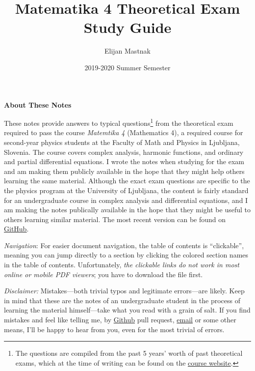 \documentclass[11pt, a4paper]{article}
\begin{document}
\title{Matematika 4 Theoretical Exam Study Guide}
\author{Elijan Mastnak}
\date{2019-2020 Summer Semester}
\maketitle

\begin{center}
\textbf{About These Notes}
\end{center}
These notes provide answers to typical questions\footnote{The questions are compiled from the past 5 years' worth of past theoretical exams, which at the time of writing can be found on the \href{https://www.fmf.uni-lj.si/~magajna/Matematika4FIZ/osnovna.htm}{\underline{course website}}.} from the theoretical exam required to pass the course \textit{Matemtika 4} (Mathematics 4), a required course for second-year physics students at the Faculty of Math and Physics in Ljubljana, Slovenia. The course covers complex analysis, harmonic functions, and ordinary and partial differential equations. I wrote the notes when studying for the exam and am making them publicly available in the hope that they might help others learning the same material. Although the exact exam questions are specific to the the physics program at the University of Ljubljana, the content is fairly standard for an undergraduate course in complex analysis and differential equations, and I am making the notes publically available in the hope that they might be useful to others learning similar material. The most recent version can be found on \href{https://github.com/ejmastnak/fmf/tree/main/math-4}{\underline{GitHub}}.


\vspace{2mm}
\textit{Navigation}: For easier document navigation, the table of contents is ``clickable'', meaning you can jump directly to a section by clicking the colored section names in the table of contents. Unfortunately, \textit{the clickable links do not work in most online or mobile PDF viewers}; you have to download the file first.


\vspace{2mm}
\textit{Disclaimer:} Mistakes---both trivial typos and legitimate errors---are likely. Keep in mind that these are the notes of an undergraduate student in the process of learning the material himself---take what you read with a grain of salt. If you find mistakes and feel like telling me, by \href{https://github.com/ejmastnak/fmf}{Github} pull request, \href{mailto:ejmastnak@gmail.com}{email} or some other means, I'll be happy to hear from you, even for the most trivial of errors.
\end{document}
